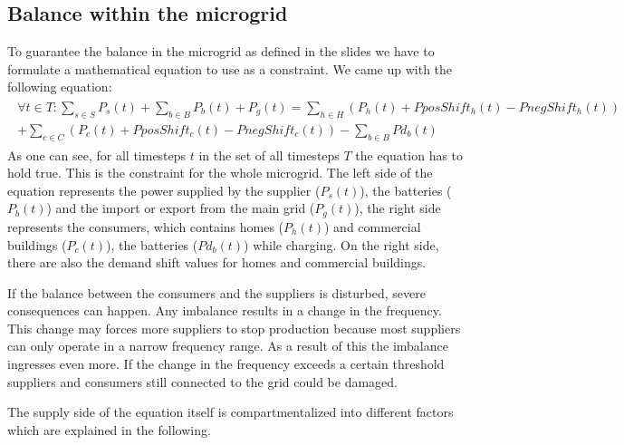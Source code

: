 \subsection{Balance within the microgrid}
To guarantee the balance in the microgrid as defined in the slides we have to formulate a mathematical equation to use as a constraint.
We came up with the following equation:\\
\begin{align} \label{eq1:balance}
\begin{split}
\forall t \in T: \sum\limits_{s \in S}{P_{s}(t)} + \sum\limits_{b \in B}{P_{b}(t)} + P_{g}(t) = \sum_{h \in H}({P_{h}(t)} + PposShift_h(t) - PnegShift_h(t))
\\ + \sum_{c \in C}({P_{c}(t)} + PposShift_c(t) - PnegShift_c(t)) - \sum\limits_{b \in B}{Pd_{b}(t)}
\end{split}
\end{align}
As one can see, for all timesteps $t$ in the set of all timesteps $T$ the equation has to hold true. 
This is the constraint for the whole microgrid. 
The left side of the equation represents the power supplied by the supplier ($P_{s}(t)$), the batteries ($P_{b}(t)$) and the import or export from the main grid ($P_{g}(t)$), the right side represents the consumers, which contains homes ($P_{h}(t)$) and commercial buildings ($P_{c}(t)$), the batteries ($Pd_{b}(t)$) while charging. 
On the right side, there are also the demand shift values for homes and commercial buildings.

If the balance between the consumers and the suppliers is disturbed, severe consequences can happen. 
Any imbalance results in a change in the frequency. 
This change may forces more suppliers to stop production because most suppliers can only operate in a narrow frequency range. 
As a result of this the imbalance ingresses even more. 
If the change in the frequency exceeds a certain threshold suppliers and consumers still connected to the grid could be damaged. 

The supply side of the equation itself is compartmentalized into different factors which are explained in the following.

